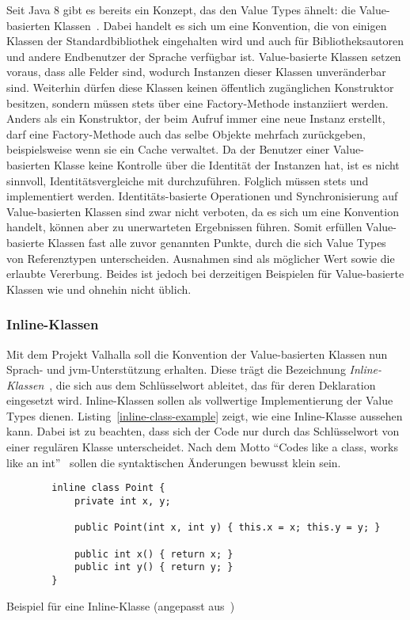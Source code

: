 Seit Java 8 gibt es bereits ein Konzept, das den Value Types ähnelt: die Value-basierten Klassen~\cite{value-based-classes}.
Dabei handelt es sich um eine Konvention, die von einigen Klassen der Standardbibliothek eingehalten wird und auch für Bibliotheksautoren und andere Endbenutzer der Sprache verfügbar ist.
Value-basierte Klassen setzen voraus, dass alle Felder  sind, wodurch Instanzen dieser Klassen unveränderbar sind.
Weiterhin dürfen diese Klassen keinen öffentlich zugänglichen Konstruktor besitzen, sondern müssen stets über eine Factory-Methode instanziiert werden.
Anders als ein Konstruktor, der beim Aufruf immer eine neue Instanz erstellt, darf eine Factory-Methode auch das selbe Objekte mehrfach zurückgeben, beispielsweise wenn sie ein Cache verwaltet.
Da der Benutzer einer Value-basierten Klasse keine Kontrolle über die Identität der Instanzen hat, ist es nicht sinnvoll, Identitätsvergleiche mit \code{==} durchzuführen.
Folglich müssen stets  und  implementiert werden.
Identitäts-basierte Operationen und Synchronisierung auf Value-basierten Klassen sind zwar nicht verboten, da es sich um eine Konvention handelt, können aber zu unerwarteten Ergebnissen führen.
Somit erfüllen Value-basierte Klassen fast alle zuvor genannten Punkte, durch die sich Value Types von Referenztypen unterscheiden.
Ausnahmen sind  als möglicher Wert sowie die erlaubte Vererbung.
Beides ist jedoch bei derzeitigen Beispielen für Value-basierte Klassen wie  und  ohnehin nicht üblich.

\subsubsection{Inline-Klassen}

Mit dem Projekt Valhalla soll die Konvention der Value-basierten Klassen nun Sprach- und \ac{jvm}-Unterstützung erhalten.
Diese trägt die Bezeichnung \emph{Inline-Klassen}~\cite{object-model}, die sich aus dem Schlüsselwort  ableitet, das für deren Deklaration eingesetzt wird.
Inline-Klassen sollen als vollwertige Implementierung der Value Types dienen.
Listing~\ref{inline-class-example} zeigt, wie eine Inline-Klasse aussehen kann.
Dabei ist zu beachten, dass sich der Code nur durch das Schlüsselwort  von einer regulären Klasse unterscheidet.
Nach dem Motto ``Codes like a class, works like an int''~\cite{object-model} sollen die syntaktischen Änderungen bewusst klein sein.

\begin{listing}
    \begin{verbatim}
        inline class Point {
            private int x, y;

            public Point(int x, int y) { this.x = x; this.y = y; }

            public int x() { return x; }
            public int y() { return y; }
        }
    \end{verbatim}
    \vspace{-3ex}
    \caption{Beispiel für eine Inline-Klasse (angepasst aus~\cite{object-model})}
    \label{inline-class-example}
\end{listing}

